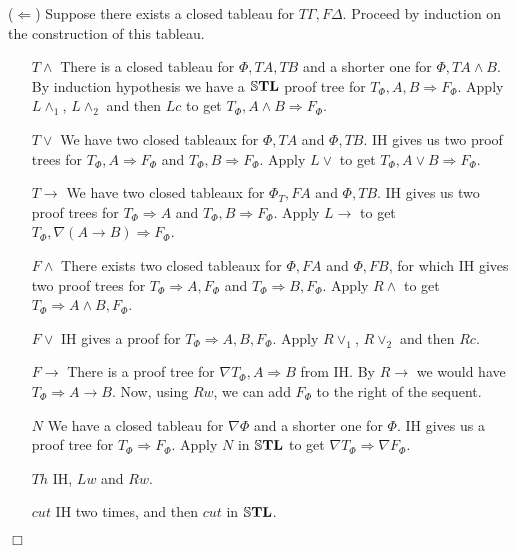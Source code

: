 \documentclass[a4paper, 12pt]{paper}
\begin{document}
($\Leftarrow$) Suppose there exists a closed tableau for $T \Gamma, F \Delta$. Proceed by induction on the construction of this tableau.

\begin{enumerate}
  \item[$T \wedge$] There is a closed tableau for $\Phi, T A, T B$ and a shorter one for $\Phi, T A \wedge B$. By induction hypothesis we have a $\mathbb{S}\mathbf{TL}$ proof tree for $T_\Phi, A, B \Rightarrow F_\Phi$. Apply $L \wedge_1$, $L \wedge_2$ and then $L c$ to get $T_\Phi, A \wedge B \Rightarrow F_\Phi$.
  \item[$T \vee$] We have two closed tableaux for $\Phi, T A$ and $\Phi, T B$. IH gives us two proof trees for $T_\Phi, A \Rightarrow F_\Phi$ and $T_\Phi, B \Rightarrow F_\Phi$. Apply $L \vee$ to get $T_\Phi, A \vee B \Rightarrow F_\Phi$.
  \item[$T \rightarrow$] We have two closed tableaux for $\Phi_T, F A$ and $\Phi, T B$. IH gives us two proof trees for $T_\Phi \Rightarrow A$ and $T_\Phi, B \Rightarrow F_\Phi$. Apply $L \rightarrow$ to get $T_\Phi, \nabla (A \rightarrow B) \Rightarrow F_\Phi$.
  \item[$F \wedge$] There exists two closed tableaux for $\Phi, F A$ and $\Phi, F B$, for which IH gives two proof trees for $T_\Phi \Rightarrow A, F_\Phi$ and $T_\Phi \Rightarrow B, F_\Phi$. Apply $R \wedge$ to get $T_\Phi \Rightarrow A \wedge B, F_\Phi$.
  \item[$F \vee$] IH gives a proof for $T_\Phi \Rightarrow A, B, F_\Phi$. Apply $R \vee_1$, $R \vee_2$ and then $R c$.
  \item[$F \rightarrow$] There is a proof tree for $\nabla T_\Phi, A \Rightarrow B$ from IH. By $R \rightarrow$ we would have $T_\Phi \Rightarrow A \rightarrow B$. Now, using $R w$, we can add $F_\Phi$ to the right of the sequent.
  \item[$N$] We have a closed tableau for $\nabla \Phi$ and a shorter one for $\Phi$. IH gives us a proof tree for $T_\Phi \Rightarrow F_\Phi$. Apply $N$ in $\mathbb{S}\mathbf{TL}$ to get $\nabla T_\Phi \Rightarrow \nabla F_\Phi$.
  \item[$Th$] IH, $L w$ and $R w$.
  \item[$cut$] IH two times, and then $cut$ in $\mathbb{S}\mathbf{TL}$.
\end{enumerate}
\begin{flushright}$\Box$\end{flushright}
\end{document}
